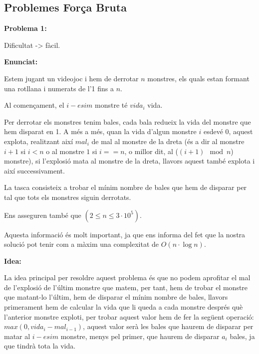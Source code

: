 \subsection{Problemes Força Bruta}

\textbf{Problema 1:} \newline

Dificultat -> fàcil. \newline

\textbf{Enunciat:} \newline

Estem jugant un videojoc i hem de derrotar $n$ monstres, els quals estan formant una rotllana i numerats de l'1 fins a $n$.

Al començament, el $i-esim$ monstre té $vida_{i}$ vida.

Per derrotar els monstres tenim bales, cada bala redueix la vida del monstre que hem disparat en 1. A més a més, quan la vida d'algun monstre $i$ esdevé 0, aquest explota, realitzant així $mal_{i}$ de mal al monstre de la dreta (és a dir al monstre $i + 1$ si $i < n$ o al monstre $1$ si $i == n$, o millor dit, al ($(i + 1) \mod n$) monstre), si l'explosió mata al monstre de la dreta, llavors aquest també explota i així successivament. \newline

La tasca consisteix a trobar el mínim nombre de bales que hem de disparar per tal que tots els monstres siguin derrotats.

Ens asseguren també que $(2\leq n \leq 3 \cdot 10^5)$.

Aquesta informació és molt important, ja que ens informa del fet que la nostra solució pot tenir com a màxim una complexitat de $O(n \cdot \log n)$. \newline

\textbf{Idea:} \newline

La idea principal per resoldre aquest problema és que no podem aprofitar el mal de l'explosió de l'últim monstre que matem, per tant, hem de trobar el monstre que matant-lo l'últim, hem de disparar el mínim nombre de bales, llavors primerament hem de calcular la vida que li queda a cada monstre després què l'anterior monstre exploti, per trobar aquest valor hem de fer la següent operació: $max(0, vida_{i} - mal_{i-1})$, aquest valor serà les bales que haurem de disparar per matar al $i-esim$ monstre, menys pel primer, que haurem de disparar $a_{i}$ bales, ja que tindrà tota la vida.

\newline


